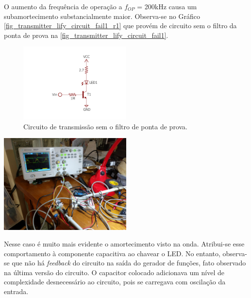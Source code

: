 	O aumento da frequência de operação a $f_{OP}$ = 200kHz causa um subamortecimento substancialmente maior. Observa-se no Gráfico \ref{fig_transmitter_lify_circuit_fail1_r1} que provém de circuito sem o filtro da ponta de prova na \autoref{fig_transmitter_lify_circuit_fail1}.
	\begin{figure}[h!]
		\caption{\label{fig_transmitter_lify_circuit_fail1}Circuito de transmissão sem o filtro de ponta de prova.}
		\centering
		\includegraphics[width=0.5\textwidth, trim={2cm 2cm 2cm 2.3cm}, clip]{circuits/transmitter_fail1.pdf}
	\end{figure}
	\begin{chart}[h!]
		\caption{\label{fig_transmitter_lify_circuit_fail1_r1}Operação de circuito transmissor sem ponta de prova. A onda amarela representa voltagem no LED sem filtro de ponta de prova em frequências mais altas. O gerador de funções é medido e gera a forma de onda verde.}
		\centering
		\includegraphics[width=0.5\textwidth, trim={22.5cm 69cm 87cm 16cm}, clip]{circuits/photos/TX_200k_without_filter.jpg}
	\end{chart}
	Nesse caso é muito mais evidente o amortecimento visto na onda. Atribui-se esse comportamento à componente capacitiva ao chavear o LED. No entanto, observa-se que não há \textit{feedback} do circuito na saída do gerador de funções, fato observado na última versão do circuito. O capacitor colocado adicionava um nível de complexidade desnecessário ao circuito, pois se carregava com oscilação da entrada. 
	
